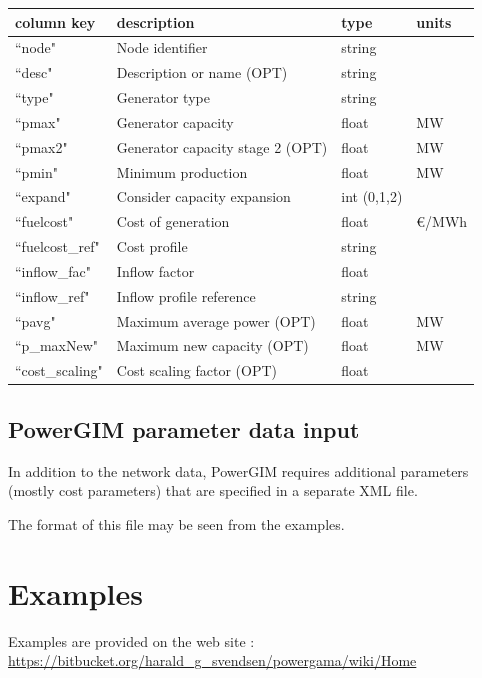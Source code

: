 \documentclass{article}
\begin{document}
\medskip
\begin{tabular}{llll}
	\hline
	 column key & description & type & units \\
	\hline
	``node"			& Node identifier 		& string	& \\
	``desc"			& Description or name (OPT)	& string	& \\
	``type"			& Generator type		& string	& \\
	``pmax"			& Generator capacity 	& float	& MW \\
	``pmax2"			& Generator capacity stage 2 (OPT) 	& float	& MW \\
	``pmin"			& Minimum production	& float	& MW \\
	``expand"			& Consider capacity expansion & int (0,1,2)		& \\
	``fuelcost"		& Cost of generation		& float	& €/MWh \\
	``fuelcost\_ref"	& Cost profile		& string \\
	``inflow\_fac"	& Inflow factor			& float	&  \\
	``inflow\_ref"		& Inflow profile reference	& string & \\
	``pavg"			& Maximum average power (OPT)		& float	& MW \\
	``p\_maxNew"	& Maximum new capacity (OPT)		& float	& MW \\	
	``cost\_scaling"	& Cost scaling factor (OPT) & float	&  \\
	\hline
\end{tabular}

\subsection{PowerGIM parameter data input}
In addition to the network data, PowerGIM requires additional parameters (mostly cost parameters) that are specified in a separate XML file.

The format of this file may be seen from the examples.


\section{Examples}

Examples are provided on the web site \cite{powergamauserguide}:\\
\url{https://bitbucket.org/harald_g_svendsen/powergama/wiki/Home}






%
%

\end{document}
